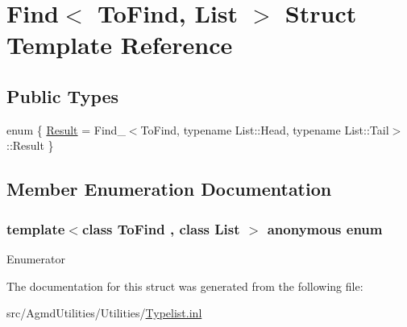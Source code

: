 \hypertarget{struct_find}{\section{Find$<$ To\+Find, List $>$ Struct Template Reference}
\label{struct_find}
}
\subsection*{Public Types}
\begin{DoxyCompactItemize}
\item 
enum \{ \hyperlink{struct_find_ae18d3a737122e55ff58735ad3a33f4baa1ba38a9880421edf91a10862f7441d73}{Result} = Find\+\_\+$<$To\+Find, typename List\+:\+:Head, typename List\+:\+:Tail$>$\+:\+:Result
 \}
\end{DoxyCompactItemize}


\subsection{Member Enumeration Documentation}
\hypertarget{struct_find_ae18d3a737122e55ff58735ad3a33f4ba}{\subsubsection[{anonymous enum}]{\setlength{\rightskip}{0pt plus 5cm}template$<$class To\+Find , class List $>$ anonymous enum}}\label{struct_find_ae18d3a737122e55ff58735ad3a33f4ba}
\begin{Desc}
\item[Enumerator]\par
\begin{description}
\item[{\em 
\hypertarget{struct_find_ae18d3a737122e55ff58735ad3a33f4baa1ba38a9880421edf91a10862f7441d73}{Result}\label{struct_find_ae18d3a737122e55ff58735ad3a33f4baa1ba38a9880421edf91a10862f7441d73}
}]\end{description}
\end{Desc}


The documentation for this struct was generated from the following file\+:\begin{DoxyCompactItemize}
\item 
src/\+Agmd\+Utilities/\+Utilities/\hyperlink{_typelist_8inl}{Typelist.\+inl}\end{DoxyCompactItemize}
